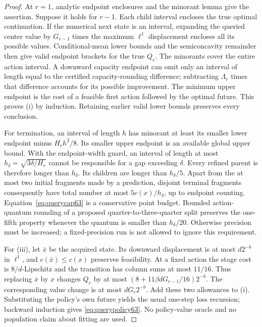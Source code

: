 \begin{proof}
At $r=1$, analytic endpoint enclosures and the minorant lemma give the assertion. Suppose it holds for $r-1$. Each child interval encloses the true optimal continuation. If the numerical next state is an interval, expanding the queried center value by $G_{r-1}$ times the maximum $\ell^1$ displacement encloses all its possible values. Conditional-mean lower bounds and the semiconcavity remainder then give valid endpoint brackets for the true $Q_r$. The minorants cover the entire action interval. A downward capacity endpoint can omit only an interval of length equal to the certified capacity-rounding difference; subtracting $\Lambda_r$ times that difference accounts for its possible improvement. The minimum upper endpoint is the cost of a feasible first action followed by the optimal future. This proves (i) by induction. Retaining earlier valid lower bounds preserves every conclusion.

For termination, an interval of length $h$ has minorant at least its smaller lower endpoint minus $H_rh^2/8$. Its smaller upper endpoint is an available global upper bound. With the endpoint-width guard, an interval of length at most
$h_\delta=\sqrt{3\delta/H_r}$ cannot be responsible for a gap exceeding $\delta$. Every refined parent is therefore longer than $h_\delta$. Its children are longer than $h_\delta/5$. Apart from the at most two initial fragments made by a prediction, disjoint terminal fragments consequently have total number at most $5c(x)/h_\delta$, up to endpoint counting. Equation~\eqref{eq:querycap63} is a conservative point budget. Bounded action-quantum rounding of a proposed quarter-to-three-quarter split preserves the one-fifth property whenever the quantum is smaller than $h_\delta/20$. Otherwise precision must be increased; a fixed-precision run is not allowed to ignore this requirement.

For (iii), let $\bar x$ be the acquired state. Its downward displacement is at most $d2^{-b}$ in $\ell^1$, and $c(\bar x)\le c(x)$ preserves feasibility. At a fixed action the stage cost is $8/d$-Lipschitz and the transition has column sums at most $11/16$. Thus replacing $\bar x$ by $x$ changes $Q_r$ by at most $(8+11\beta dG_{r-1}/16)2^{-b}$. The corresponding value change is at most $dG_r2^{-b}$. Add these two allowances to (i). Substituting the policy's own future yields the usual one-step loss recursion; backward induction gives \eqref{eq:querypolicy63}. No policy-value oracle and no population claim about fitting are used.
\end{proof}


